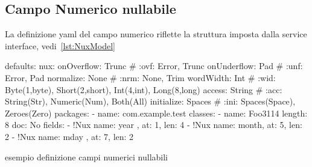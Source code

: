 \documentclass[a4paper,10pt]{report}
\newif\ifesource
\newenvironment{elisting}[1][H]
  {\captionsetup{aboveskip=0pt}\begin{listing}[#1]}
  {\end{listing}%
}
\begin{document}
\subsection{Campo Numerico nullabile} \label{sub:yaml.nux}
La definizione yaml del campo numerico riflette la struttura imposta dalla
service interface, vedi~\ref{lst:NuxModel}

\ifesource
\begin{figure*}[!htb]
\begin{lstlisting}[language=yaml, 
caption={esempio definizione campi numerici nullabili}, 
label=lst:xmplNux]
defaults:
  nux:
    onOverflow: Trunc   # :ovf: Error, Trunc
    onUnderflow: Pad    # :unf: Error, Pad
    normalize: None     # :nrm: None, Trim
    wordWidth: Int      # :wid: Byte(1,byte), Short(2,short), Int(4,int), Long(8,long)
    access: String      # :acc: String(Str), Numeric(Num), Both(All)
    initialize: Spaces  # :ini: Spaces(Space), Zeroes(Zero)
packages:
  - name: com.example.test
    classes:
      - name: Foo3114
        length: 8
        doc: No
        fields:
          - !Nux { name: year , at: 1, len: 4 }
          - !Nux { name: month, at: 5, len: 2 }
          - !Nux { name: mday , at: 7, len: 2 }
\end{lstlisting}
\end{figure*}
\else
\begin{elisting}[!htb]
\begin{yamlcode}
defaults:
  nux:
    onOverflow: Trunc   # :ovf: Error, Trunc
    onUnderflow: Pad    # :unf: Error, Pad
    normalize: None     # :nrm: None, Trim
    wordWidth: Int      # :wid: Byte(1,byte), Short(2,short), Int(4,int), Long(8,long)
    access: String      # :acc: String(Str), Numeric(Num), Both(All)
    initialize: Spaces  # :ini: Spaces(Space), Zeroes(Zero)
packages:
  - name: com.example.test
    classes:
      - name: Foo3114
        length: 8
        doc: No
        fields:
          - !Nux { name: year , at: 1, len: 4 }
          - !Nux { name: month, at: 5, len: 2 }
          - !Nux { name: mday , at: 7, len: 2 }
\end{yamlcode}
\caption{esempio definizione campi numerici nullabili}
\label{lst:xmplNux}
\end{elisting}
\fi
\end{document}

